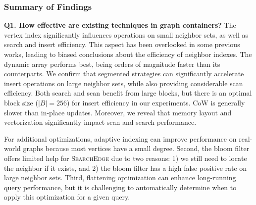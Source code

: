 


\subsubsection{Summary of Findings} \textbf{Q1. How effective are existing techniques in graph containers?} The vertex index significantly influences operations on small neighbor sets, as well as search and insert efficiency. This aspect has been overlooked in some previous works, leading to biased conclusions about the efficiency of neighbor indexes. The dynamic array performs best, being orders of magnitude faster than its counterparts. We confirm that segmented strategies can significantly accelerate insert operations on large neighbor sets, while also providing considerable scan efficiency. Both search and scan benefit from large blocks, but there is an optimal block size ($|B| = 256$) for insert efficiency in our experiments. CoW is generally slower than in-place updates. Moreover, we reveal that memory layout and vectorization significantly impact scan and search performance.


For additional optimizations, adaptive indexing can improve performance on real-world graphs because most vertices have a small degree. Second, the bloom filter offers limited help for \textsc{SearchEdge} due to two reasons: 1) we still need to locate the neighbor if it exists, and 2) the bloom filter has a high false positive rate on large neighbor sets. Third, flattening optimization can enhance long-running query performance, but it is challenging to automatically determine when to apply this optimization for a given query.

